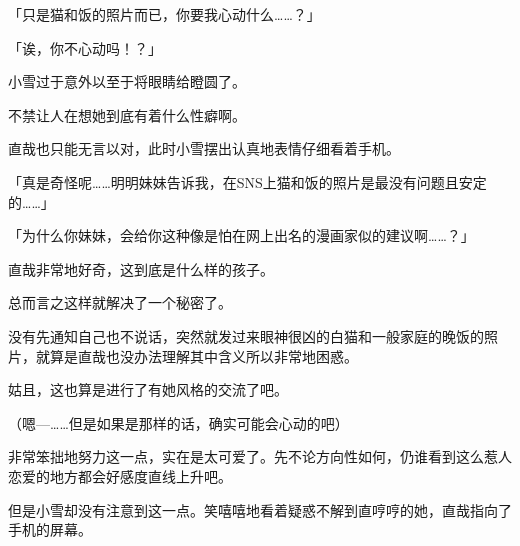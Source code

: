 「只是猫和饭的照片而已，你要我心动什么……？」

「诶，你不心动吗！？」

小雪过于意外以至于将眼睛给瞪圆了。

不禁让人在想她到底有着什么性癖啊。

直哉也只能无言以对，此时小雪摆出认真地表情仔细看着手机。

「真是奇怪呢……明明妹妹告诉我，在SNS上猫和饭的照片是最没有问题且安定的……」

「为什么你妹妹，会给你这种像是怕在网上出名的漫画家似的建议啊……？」

直哉非常地好奇，这到底是什么样的孩子。

总而言之这样就解决了一个秘密了。

没有先通知自己也不说话，突然就发过来眼神很凶的白猫和一般家庭的晚饭的照片，就算是直哉也没办法理解其中含义所以非常地困惑。

姑且，这也算是进行了有她风格的交流了吧。

（嗯—……但是如果是那样的话，确实可能会心动的吧）

非常笨拙地努力这一点，实在是太可爱了。先不论方向性如何，仍谁看到这么惹人恋爱的地方都会好感度直线上升吧。

但是小雪却没有注意到这一点。笑嘻嘻地看着疑惑不解到直哼哼的她，直哉指向了手机的屏幕。

